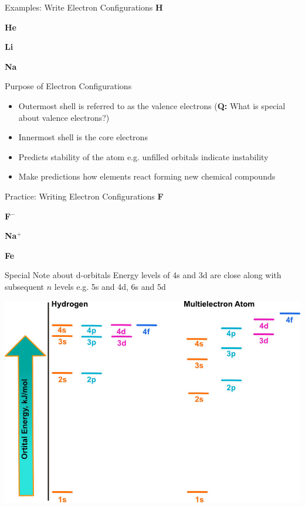 \documentclass[11pt]{beamer}
\begin{document}
\begin{frame}{Examples: Write Electron Configurations}
  \textbf{H}
  \vspace{0.25in}
  
  \textbf{He}
  \vspace{0.25in}
  
  \textbf{Li}
  \vspace{0.25in}

  \textbf{Na}
\end{frame}

\begin{frame}{Purpose of Electron Configurations}
  \begin{itemize}
  \item Outermost shell is referred to as the valence
    electrons (\textbf{Q:} What is special about valence electrons?)
  \item Innermost shell is the core electrons
  \item Predicts stability of the atom e.g. unfilled orbitals
    indicate instability
  \item Make predictions how elements react forming new chemical
    compounds
  \end{itemize}
\end{frame}

\begin{frame}{Practice: Writing Electron Configurations}
  \textbf{F}
  \vspace{0.25in}
  
  \textbf{F$^-$}
  \vspace{0.25in}
  
  \textbf{Na$^+$}
  \vspace{0.25in}

  \textbf{Fe}
\end{frame}

\begin{frame}{Special Note about d-orbitals}
  Energy levels of 4s and 3d are close along with subsequent $n$ levels
  e.g. 5s and 4d, 6s and 5d
  
  \centering
  \includegraphics[scale=1.3]{orbital_energy}
\end{frame}
\end{document}
